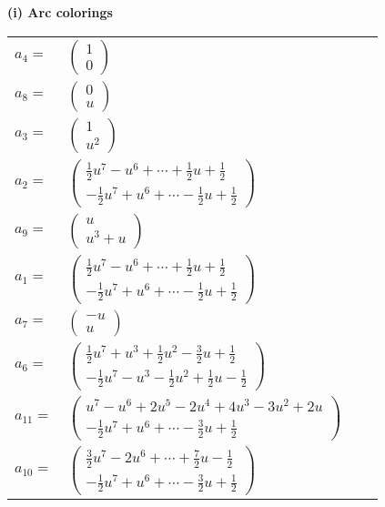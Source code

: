 \documentclass[1p]{elsarticle_modified}
\theoremstyle{definition}
\begin{document}
\flushleft \textbf{(i) Arc colorings}\\
\begin{tabular}{m{7pt} m{180pt} m{7pt} m{180pt} }
\flushright $a_{4}=$&$\begin{pmatrix}1\\0\end{pmatrix}$ \\
\flushright $a_{8}=$&$\begin{pmatrix}0\\u\end{pmatrix}$ \\
\flushright $a_{3}=$&$\begin{pmatrix}1\\u^2\end{pmatrix}$ \\
\flushright $a_{2}=$&$\begin{pmatrix}\frac{1}{2} u^7- u^6+\cdots+\frac{1}{2} u+\frac{1}{2}\\-\frac{1}{2} u^7+u^6+\cdots-\frac{1}{2} u+\frac{1}{2}\end{pmatrix}$ \\
\flushright $a_{9}=$&$\begin{pmatrix}u\\u^3+u\end{pmatrix}$ \\
\flushright $a_{1}=$&$\begin{pmatrix}\frac{1}{2} u^7- u^6+\cdots+\frac{1}{2} u+\frac{1}{2}\\-\frac{1}{2} u^7+u^6+\cdots-\frac{1}{2} u+\frac{1}{2}\end{pmatrix}$ \\
\flushright $a_{7}=$&$\begin{pmatrix}- u\\u\end{pmatrix}$ \\
\flushright $a_{6}=$&$\begin{pmatrix}\frac{1}{2} u^7+u^3+\frac{1}{2} u^2-\frac{3}{2} u+\frac{1}{2}\\-\frac{1}{2} u^7- u^3-\frac{1}{2} u^2+\frac{1}{2} u-\frac{1}{2}\end{pmatrix}$ \\
\flushright $a_{11}=$&$\begin{pmatrix}u^7- u^6+2 u^5-2 u^4+4 u^3-3 u^2+2 u\\-\frac{1}{2} u^7+u^6+\cdots-\frac{3}{2} u+\frac{1}{2}\end{pmatrix}$ \\
\flushright $a_{10}=$&$\begin{pmatrix}\frac{3}{2} u^7-2 u^6+\cdots+\frac{7}{2} u-\frac{1}{2}\\-\frac{1}{2} u^7+u^6+\cdots-\frac{3}{2} u+\frac{1}{2}\end{pmatrix}$ \\

\end{tabular}
\end{document}
